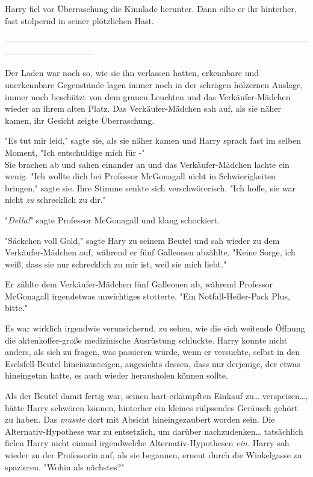 {Harry fiel vor Überraschung die Kinnlade herunter. Dann eilte er ihr hinterher, fast stolpernd in seiner plötzlichen Hast.

--------------------------------------------------------------------------------------------------------------------------------------------

Der Laden war noch so, wie sie ihn verlassen hatten, erkennbare und unerkennbare Gegenstände lagen immer noch in der schrägen hölzernen Auslage, immer noch beschützt von dem grauen Leuchten und das Verkäufer-Mädchen wieder an ihrem alten Platz. Das Verkäufer-Mädchen sah auf, als sie näher kamen, ihr Gesicht zeigte Überraschung.

"Es tut mir leid," sagte sie, als sie näher kamen und Harry sprach fast im selben Moment, "Ich entschuldige mich für -"\\ Sie brachen ab und sahen einander an und das Verkäufer-Mädchen lachte ein wenig. "Ich wollte dich bei Professor McGonagall nicht in Schwierigkeiten bringen," sagte sie. Ihre Stimme senkte sich verschwörerisch. "Ich hoffe, sie war nicht \emph{zu} schrecklich zu dir."

"\emph{Della!}" sagte Professor McGonagall und klang schockiert.

"Säckchen voll Gold," sagte Hary zu seinem Beutel und sah wieder zu dem Verkäufer-Mädchen auf, während er fünf Galleonen abzählte. "Keine Sorge, ich weiß, dass sie nur schrecklich zu mir ist, weil sie mich liebt."

Er zählte dem Verkäufer-Mädchen fünf Galleonen ab, während Professor McGonagall irgendetwas unwichtiges stotterte. "Ein Notfall-Heiler-Pack Plus, bitte."

Es war wirklich irgendwie verunsichernd, zu sehen, wie die sich weitende Öffnung die aktenkoffer-große medizinische Ausrüstung schluckte. Harry konnte nicht anders, als sich zu fragen, was passieren würde, wenn er versuchte, selbst in den Eselsfell-Beutel hineinzusteigen, angesichts dessen, dass nur derjenige, der etwas hineingetan hatte, es auch wieder herausholen können sollte.

Als der Beutel damit fertig war, seinen hart-erkämpften Einkauf zu… verspeisen…, hätte Harry schwören können, hinterher ein kleines rülpsendes Geräusch gehört zu haben. Das \emph{musste} dort mit Absicht hineingezaubert worden sein. Die Alternativ-Hypothese war zu entsetzlich, um darüber nachzudenken… tatsächlich fielen Harry nicht einmal irgendwelche Alternativ-Hypothesen \emph{ein.} Harry sah wieder zu der Professorin auf, als sie begannen, erneut durch die Winkelgasse zu spazieren. "Wohin als nächstes?"

}
